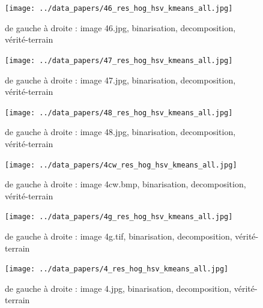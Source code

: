 \documentclass{book}
\begin{document}
\begin{figure}[H]
\begin{center}
\texttt{[image: ../data\_papers/46\_res\_hog\_hsv\_kmeans\_all.jpg]}
\end{center}
\caption{de gauche à droite : image 46.jpg, binarisation, decomposition, vérité-terrain}
\label{46}
\end{figure}
\clearpage


\begin{figure}[H]
\begin{center}
\texttt{[image: ../data\_papers/47\_res\_hog\_hsv\_kmeans\_all.jpg]}
\end{center}
\caption{de gauche à droite : image 47.jpg, binarisation, decomposition, vérité-terrain}
\label{47}
\end{figure}
\clearpage


\begin{figure}[H]
\begin{center}
\texttt{[image: ../data\_papers/48\_res\_hog\_hsv\_kmeans\_all.jpg]}
\end{center}
\caption{de gauche à droite : image 48.jpg, binarisation, decomposition, vérité-terrain}
\label{48}
\end{figure}
\clearpage


\begin{figure}[H]
\begin{center}
\texttt{[image: ../data\_papers/4cw\_res\_hog\_hsv\_kmeans\_all.jpg]}
\end{center}
\caption{de gauche à droite : image 4cw.bmp, binarisation, decomposition, vérité-terrain}
\label{4cw}
\end{figure}
\clearpage


\begin{figure}[H]
\begin{center}
\texttt{[image: ../data\_papers/4g\_res\_hog\_hsv\_kmeans\_all.jpg]}
\end{center}
\caption{de gauche à droite : image 4g.tif, binarisation, decomposition, vérité-terrain}
\label{4g}
\end{figure}
\clearpage


\begin{figure}[H]
\begin{center}
\texttt{[image: ../data\_papers/4\_res\_hog\_hsv\_kmeans\_all.jpg]}
\end{center}
\caption{de gauche à droite : image 4.jpg, binarisation, decomposition, vérité-terrain}
\label{4}
\end{figure}
\clearpage
\end{document}
